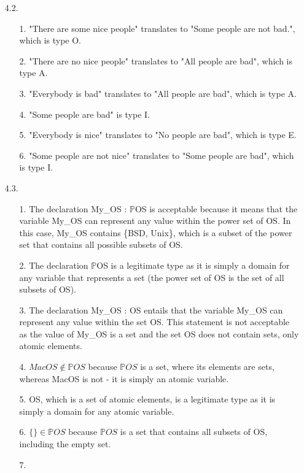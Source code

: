 \documentclass[12pt]{article}
\begin{document}
\begin{enumerate}
\item[4.2.]
\begin{enumerate}
    \item[1.]
    \noindent "There are some nice people" translates to "Some people are not bad.", which is type O.
    \item[2.]
    \noindent "There are no nice people" translates to "All people are bad", which is type A.
    \item[3.]
    \noindent "Everybody is bad" translates to "All people are bad", which is type A.
    \item[4.]
    \noindent "Some people are bad" is type I.
    \item[5.]
    \noindent "Everybody is nice" translates to "No people are bad", which is type E.
    \item[6.]
    \noindent "Some people are not nice" translates to "Some people are bad", which is type I.
\end{enumerate}
\item[4.3.]
\begin{enumerate}
    \item[1.]
    \noindent The declaration My\_OS : $\mathbb{P}$OS is acceptable because it means that the variable My\_OS can represent any value within the power set of OS. In this case, My\_OS contains \{BSD, Unix\}, which is a subset of the power set that contains all possible subsets of OS.
    \item[2.]
    \noindent The declaration $\mathbb{P}$OS is a legitimate type as it is simply a domain for any variable that represents a set (the power set of OS is the set of all subsets of OS).
    \item[3.]
    \noindent The declaration My\_OS : OS entails that the variable My\_OS can represent any value within the set OS. This statement is not acceptable as the value of My\_OS is a set and the set OS does not contain sets, only atomic elements.
    \item[4.]
    \noindent $MacOS \notin \mathbb{P}OS$ because $\mathbb{P}OS$ is a set, where its elements are sets, whereas MacOS is not - it is simply an atomic variable.
    \item[5.]
    \noindent OS, which is a set of atomic elements, is a legitimate type as it is simply a domain for any atomic variable.
    \item[6.]
    \noindent $\{\}\in \mathbb{P}OS$ because $\mathbb{P}OS$ is a set that contains all subsets of OS, including the empty set.
    \item[7.]

\end{enumerate}
\end{enumerate}
\end{document}
